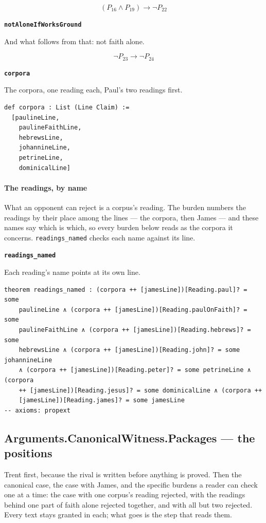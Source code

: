 \documentclass[11pt]{article}
\begin{document}
\[(P_{16} \land P_{19}) \rightarrow \lnot P_{22}\]
\par\medskip\noindent\textbf{\texttt{not\allowbreak{}Alone\allowbreak{}If\allowbreak{}Works\allowbreak{}Ground}}\par\nobreak\noindent
And what follows from that: not faith alone.

\[\lnot P_{23} \rightarrow \lnot P_{24}\]
\par\medskip\noindent\textbf{\texttt{corpora}}\par\nobreak\noindent
The corpora, one reading each, Paul's two readings first.

{\small\begin{verbatim}
def corpora : List (Line Claim) :=
  [paulineLine,
    paulineFaithLine,
    hebrewsLine,
    johannineLine,
    petrineLine,
    dominicalLine]
\end{verbatim}}
\paragraph*{The readings, by name}
\leavevmode\par
What an opponent can reject is a corpus's reading. The burden numbers the readings by their place among the lines — the corpora, then James — and these names say which is which, so every burden below reads as the corpora it concerns. \texttt{readings\_\allowbreak{}named} checks each name against its line.

\par\medskip\noindent\textbf{\texttt{readings\_\allowbreak{}named}}\par\nobreak\noindent
Each reading's name points at its own line.

{\small\begin{verbatim}
theorem readings_named : (corpora ++ [jamesLine])[Reading.paul]? = some
    paulineLine ∧ (corpora ++ [jamesLine])[Reading.paulOnFaith]? = some
    paulineFaithLine ∧ (corpora ++ [jamesLine])[Reading.hebrews]? = some
    hebrewsLine ∧ (corpora ++ [jamesLine])[Reading.john]? = some johannineLine
    ∧ (corpora ++ [jamesLine])[Reading.peter]? = some petrineLine ∧ (corpora
    ++ [jamesLine])[Reading.jesus]? = some dominicalLine ∧ (corpora ++
    [jamesLine])[Reading.james]? = some jamesLine
-- axioms: propext
\end{verbatim}}
\subsection*{Arguments.CanonicalWitness.Packages — the positions}
Trent first, because the rival is written before anything is proved. Then the canonical case, the case with James, and the specific burdens a reader can check one at a time: the case with one corpus's reading rejected, with the readings behind one part of faith alone rejected together, and with all but two rejected. Every text stays granted in each; what goes is the step that reads them.
\end{document}
